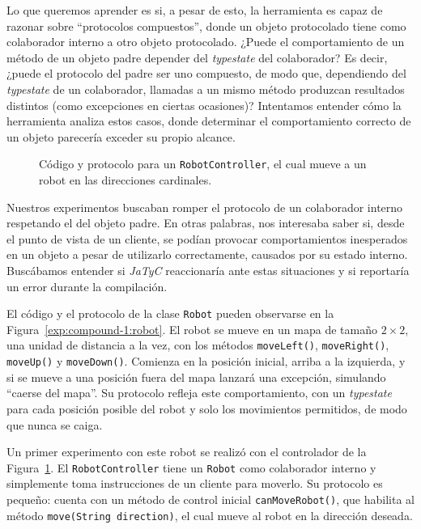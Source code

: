 Lo que queremos aprender es si, a pesar de esto, la herramienta es capaz de razonar sobre ``protocolos compuestos'', donde un objeto protocolado tiene como colaborador interno a otro objeto protocolado. ¿Puede el comportamiento de un método de un objeto padre depender del \textit{typestate} del colaborador? Es decir, ¿puede el protocolo del padre ser uno compuesto, de modo que, dependiendo del \textit{typestate} de un colaborador, llamadas a un mismo método produzcan resultados distintos (como excepciones en ciertas ocasiones)? Intentamos entender cómo la herramienta analiza estos casos, donde determinar el comportamiento correcto de un objeto parecería exceder su propio alcance.

\begin{figure}[htbp]
    \centering
    
    \vspace{0.3cm}
    
    \caption{Código y protocolo para un \texttt{RobotController}, el cual mueve a un robot en las direcciones cardinales.}
    \label{exp:compound-1:controller}
\end{figure}

Nuestros experimentos buscaban romper el protocolo de un colaborador interno respetando el del objeto padre. En otras palabras, nos interesaba saber si, desde el punto de vista de un cliente, se podían provocar comportamientos inesperados en un objeto a pesar de utilizarlo correctamente, causados por su estado interno. Buscábamos entender si \textit{JaTyC} reaccionaría ante estas situaciones y si reportaría un error durante la compilación.

El código y el protocolo de la clase \texttt{Robot} pueden observarse en la Figura~\ref{exp:compound-1:robot}. El robot se mueve en un mapa de tamaño $2\times2$, una unidad de distancia a la vez, con los métodos \texttt{moveLeft()}, \texttt{moveRight()}, \texttt{moveUp()} y \texttt{moveDown()}. Comienza en la posición inicial, arriba a la izquierda, y si se mueve a una posición fuera del mapa lanzará una excepción, simulando ``caerse del mapa''. Su protocolo refleja este comportamiento, con un \textit{typestate} para cada posición posible del robot y solo los movimientos permitidos, de modo que nunca se caiga.

Un primer experimento con este robot se realizó con el controlador de la Figura~\ref{exp:compound-1:controller}. El \texttt{RobotController} tiene un \texttt{Robot} como colaborador interno y simplemente toma instrucciones de un cliente para moverlo. Su protocolo es pequeño: cuenta con un método de control inicial \texttt{canMoveRobot()}, que habilita al método \texttt{move(String direction)}, el cual mueve al robot en la dirección deseada.

